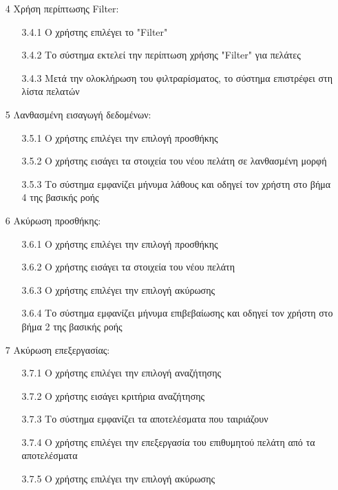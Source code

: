 \documentclass[12pt,a4paper,twoside]{book}
\begin{document}
\begin{enumerate}
  \item[4 ] Χρήση περίπτωσης Filter:
        \begin{enumerate}
          \item [3.4.1 ] Ο χρήστης επιλέγει το "Filter"  %
          \item [3.4.2 ] Το σύστημα εκτελεί την περίπτωση χρήσης "Filter" για πελάτες %
          \item [3.4.3 ] Μετά την ολοκλήρωση του φιλτραρίσματος, το σύστημα επιστρέφει στη λίστα πελατών
        \end{enumerate}
  \item[5 ] Λανθασμένη εισαγωγή δεδομένων: %
        \begin{enumerate}
          \item [3.5.1 ] Ο χρήστης επιλέγει την επιλογή προσθήκης
          \item [3.5.2 ] Ο χρήστης εισάγει τα στοιχεία του νέου πελάτη σε λανθασμένη μορφή
          \item [3.5.3 ] Το σύστημα εμφανίζει μήνυμα λάθους και οδηγεί τον χρήστη στο βήμα 4 της βασικής ροής %
        \end{enumerate}
  \item[6 ] Ακύρωση προσθήκης:
        \begin{enumerate}
          \item [3.6.1 ] Ο χρήστης επιλέγει την επιλογή προσθήκης
          \item [3.6.2 ] Ο χρήστης εισάγει τα στοιχεία του νέου πελάτη
          \item [3.6.3 ] Ο χρήστης επιλέγει την επιλογή ακύρωσης
          \item [3.6.4 ] Το σύστημα εμφανίζει μήνυμα επιβεβαίωσης και οδηγεί τον χρήστη στο βήμα 2 της βασικής ροής %
        \end{enumerate}
  \item[7 ] Ακύρωση επεξεργασίας:
        \begin{enumerate}
          \item [3.7.1 ] Ο χρήστης επιλέγει την επιλογή αναζήτησης
          \item [3.7.2 ] Ο χρήστης εισάγει κριτήρια αναζήτησης %
          \item [3.7.3 ] Το σύστημα εμφανίζει τα αποτελέσματα που ταιριάζουν
          \item [3.7.4 ] Ο χρήστης επιλέγει την επεξεργασία του επιθυμητού πελάτη από τα αποτελέσματα
          \item [3.7.5 ] Ο χρήστης επιλέγει την επιλογή ακύρωσης

\end{enumerate}
\end{enumerate}
\end{document}
